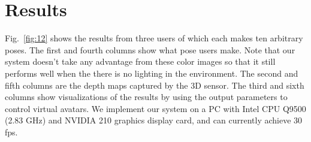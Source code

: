 \section{Results}
\label{sec:Results}
Fig.~\ref{fig:12} shows the results from three users of which each makes ten arbitrary poses. The first and fourth columns show what pose users make. Note that our system doesn’t take any advantage from these color images so that it still performs well when the there is no lighting in the environment. The second and fifth columns are the depth maps captured by the 3D sensor. The third and sixth columns show visualizations of the results by using the output parameters to control virtual avatars. We implement our system on a PC with Intel CPU Q9500 (2.83 GHz) and NVIDIA 210 graphics display card, and can currently achieve 30 fps.

